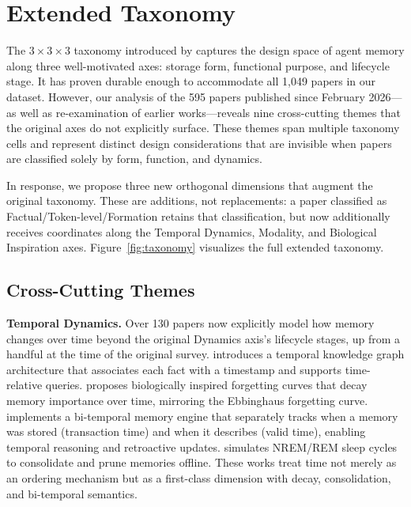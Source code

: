 \section{Extended Taxonomy}
\label{sec:taxonomy}

The $3\times 3 \times 3$ taxonomy introduced by \citet{DBLP:journals/corr/abs-2512-13564} captures the design space of agent memory along three well-motivated axes: storage form, functional purpose, and lifecycle stage. It has proven durable enough to accommodate all 1,049 papers in our dataset. However, our analysis of the 595 papers published since February 2026---as well as re-examination of earlier works---reveals nine cross-cutting themes that the original axes do not explicitly surface. These themes span multiple taxonomy cells and represent distinct design considerations that are invisible when papers are classified solely by form, function, and dynamics.

In response, we propose three new orthogonal dimensions that augment the original taxonomy. These are additions, not replacements: a paper classified as Factual/Token-level/Formation retains that classification, but now additionally receives coordinates along the Temporal Dynamics, Modality, and Biological Inspiration axes. Figure~\ref{fig:taxonomy} visualizes the full extended taxonomy.

\subsection{Cross-Cutting Themes}

\textbf{Temporal Dynamics.} Over 130 papers now explicitly model how memory changes over time beyond the original Dynamics axis's lifecycle stages, up from a handful at the time of the original survey. \citet{Unknown2025Zep} introduces a temporal knowledge graph architecture that associates each fact with a timestamp and supports time-relative queries. \citet{Unknown2026FadeMem} proposes biologically inspired forgetting curves that decay memory importance over time, mirroring the Ebbinghaus forgetting curve. \citet{Unknown2026Engram} implements a bi-temporal memory engine that separately tracks when a memory was stored (transaction time) and when it describes (valid time), enabling temporal reasoning and retroactive updates. \citet{Unknown2026SCM} simulates NREM/REM sleep cycles to consolidate and prune memories offline. These works treat time not merely as an ordering mechanism but as a first-class dimension with decay, consolidation, and bi-temporal semantics.

